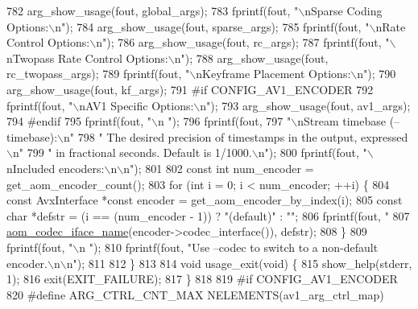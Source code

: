 \begin{DoxyCodeInclude}
{{{{{{{{782   arg\_show\_usage(fout, global\_args);
783   fprintf(fout, \textcolor{stringliteral}{"\(\backslash\)nSparse Coding Options:\(\backslash\)n"});
784   arg\_show\_usage(fout, sparse\_args);
785   fprintf(fout, \textcolor{stringliteral}{"\(\backslash\)nRate Control Options:\(\backslash\)n"});
786   arg\_show\_usage(fout, rc\_args);
787   fprintf(fout, \textcolor{stringliteral}{"\(\backslash\)nTwopass Rate Control Options:\(\backslash\)n"});
788   arg\_show\_usage(fout, rc\_twopass\_args);
789   fprintf(fout, \textcolor{stringliteral}{"\(\backslash\)nKeyframe Placement Options:\(\backslash\)n"});
790   arg\_show\_usage(fout, kf\_args);
791 \textcolor{preprocessor}{#if CONFIG\_AV1\_ENCODER}
792   fprintf(fout, \textcolor{stringliteral}{"\(\backslash\)nAV1 Specific Options:\(\backslash\)n"});
793   arg\_show\_usage(fout, av1\_args);
794 \textcolor{preprocessor}{#endif}
795   fprintf(fout, \textcolor{stringliteral}{"\(\backslash\)n        "});
796   fprintf(fout,
797       \textcolor{stringliteral}{"\(\backslash\)nStream timebase (--timebase):\(\backslash\)n"}
798       \textcolor{stringliteral}{"  The desired precision of timestamps in the output, expressed\(\backslash\)n"}
799       \textcolor{stringliteral}{"  in fractional seconds. Default is 1/1000.\(\backslash\)n"});
800   fprintf(fout, \textcolor{stringliteral}{"\(\backslash\)nIncluded encoders:\(\backslash\)n\(\backslash\)n"});
801 
802   \textcolor{keyword}{const} \textcolor{keywordtype}{int} num\_encoder = get\_aom\_encoder\_count();
803   \textcolor{keywordflow}{for} (\textcolor{keywordtype}{int} i = 0; i < num\_encoder; ++i) \{
804     \textcolor{keyword}{const} AvxInterface *\textcolor{keyword}{const} encoder = get\_aom\_encoder\_by\_index(i);
805     \textcolor{keyword}{const} \textcolor{keywordtype}{char} *defstr = (i == (num\_encoder - 1)) ? \textcolor{stringliteral}{"(default)"} : \textcolor{stringliteral}{""};
806     fprintf(fout, \textcolor{stringliteral}{"    %
807         \hyperlink{group__codec_ga013b1f6d96b2cf9489396311a7e5179b}{aom\_codec\_iface\_name}(encoder->codec\_interface()), defstr);
808   \}
809   fprintf(fout, \textcolor{stringliteral}{"\(\backslash\)n        "});
810   fprintf(fout, \textcolor{stringliteral}{"Use --codec to switch to a non-default encoder.\(\backslash\)n\(\backslash\)n"});
811 
812 \}
813 
814 \textcolor{keywordtype}{void} usage\_exit(\textcolor{keywordtype}{void}) \{
815   show\_help(stderr, 1);
816   exit(EXIT\_FAILURE);
817 \}
818 
819 \textcolor{preprocessor}{#if CONFIG\_AV1\_ENCODER}
820 \textcolor{preprocessor}{#define ARG\_CTRL\_CNT\_MAX NELEMENTS(av1\_arg\_ctrl\_map)}
}}}}}}}}}
\end{DoxyCodeInclude}
